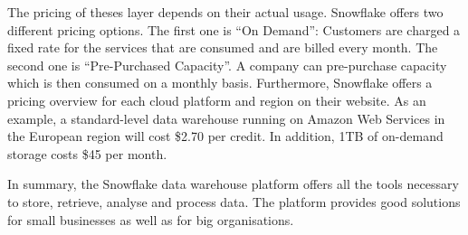\documentclass[../paper.tex]{subfiles}
\begin{document}
The pricing of theses layer depends on their actual usage. Snowflake offers two
different pricing options. The first one is “On Demand”: Customers are charged
a fixed rate for the services that are consumed and are billed every month. The
second one is “Pre-Purchased Capacity”. A company can pre-purchase capacity
which is then consumed on a monthly basis. Furthermore, Snowflake offers a
pricing overview for each cloud platform and region on their website. As an
example, a standard-level data warehouse running on Amazon Web Services in the
European region will cost \$2.70 per credit. In addition, 1TB of on-demand
storage costs \$45 per month.

In summary, the Snowflake data warehouse platform offers all the tools
necessary to store, retrieve, analyse and process data. The platform provides
good solutions for small businesses as well as for big organisations.
\end{document}
